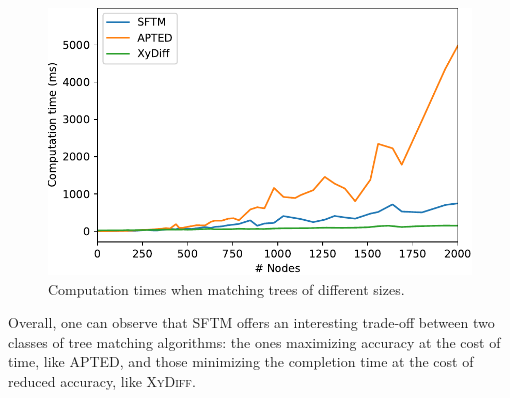 \begin{figure}%
    \centering
    \includegraphics[width=.85\linewidth]{tree-matching/graphs/computationTime}
    \caption{Computation times when matching trees of different sizes.}
    \label{sftm:fig:computation_time}
\end{figure}%

Overall, one can observe that SFTM offers an interesting trade-off between two classes of tree matching algorithms: the ones maximizing accuracy at the cost of time, like APTED, and those minimizing the completion time at the cost of reduced accuracy, like \textsc{XyDiff}.


    

